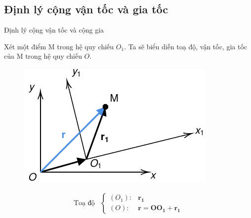 \subsection{Định lý cộng vận tốc và gia tốc}

\begin{frame}{Định lý cộng vận tốc và cộng gia}


    Xét một điểm M trong hệ quy chiếu \(O_1\). Ta sẽ biểu diễn toạ độ, vận tốc, gia tốc của M trong hệ quy chiếu \(O\).

    \begin{center}
        \begin{minipage}{0.4\linewidth}
            \begin{figure}[!htb]
                \centering
                \includegraphics[width=1\linewidth]{Figures/FoR_3.pdf}
                \caption{}
                \label{fig:FoR_3}
            \end{figure}        
        \end{minipage}
        \hspace{1mm}
        \begin{minipage}{0.45\linewidth}
        \begin{equation*}
                \begin{array}{cl}
                \text{Toạ độ} &\left\{
                \begin{array}{cl}
                (O_1): &\mathbf{r_1} \\
                (O): &\mathbf{r} = \mathbf{OO_1} + \mathbf{r_1}
                \end{array}
                \right. 
                \\

\end{array}
\end{equation*}
\end{minipage}
\end{center}
\end{frame}
